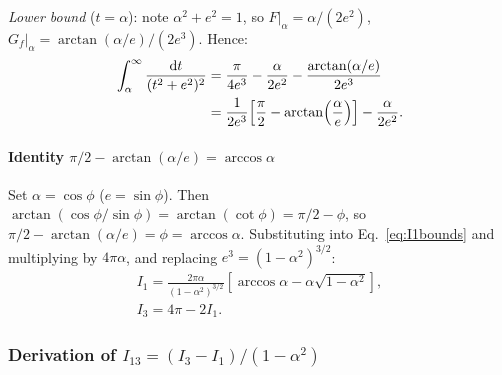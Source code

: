 \documentclass[3p]{elsarticle}
\begin{document}
\textit{Lower bound} ($t=\alpha$): note $\alpha^2+e^2=1$, so
$F|_\alpha=\alpha/(2e^2)$,
$G_f|_\alpha=\arctan(\alpha/e)/(2e^3)$. Hence:
\begin{align}
  \int_\alpha^\infty\frac{\mathrm dt}{(t^2+e^2)^2}
  &=\frac{\pi}{4e^3}-\frac{\alpha}{2e^2}
    -\frac{\arctan(\alpha/e)}{2e^3}\notag\\
  &=\frac{1}{2e^3}\!\left[\frac{\pi}{2}-\arctan\!\left(\frac{\alpha}{e}
    \right)\right]-\frac{\alpha}{2e^2}.
  \label{eq:I1bounds}
\end{align}

\paragraph{Identity $\pi/2-\arctan(\alpha/e)=\arccos\alpha$}
Set $\alpha=\cos\phi$ ($e=\sin\phi$). Then
$\arctan(\cos\phi/\sin\phi)=\arctan(\cot\phi)=\pi/2-\phi$, so
$\pi/2-\arctan(\alpha/e)=\phi=\arccos\alpha$. Substituting into
Eq.~\eqref{eq:I1bounds} and multiplying by $4\pi\alpha$, and
replacing $e^3=(1-\alpha^2)^{3/2}$:
\begin{equation}
  \boxed{\begin{gathered}
  I_1=\frac{2\pi\alpha}{(1-\alpha^2)^{3/2}}
  \!\left[\arccos\alpha-\alpha\sqrt{1-\alpha^2}\right],\\
  I_3=4\pi-2I_1.
  \end{gathered}}
  \label{eq:I1result}
\end{equation}

\subsubsection{Derivation of $I_{13}=(I_3-I_1)/(1-\alpha^2)$}
\label{sec:I13}
\end{document}
